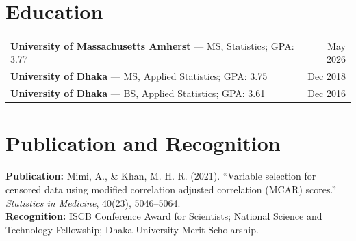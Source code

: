 \documentclass[10pt,letterpaper]{article}
\begin{document}
\section{Education}
\begin{tabularx}{\textwidth}{@{}Xr@{}}
\textbf{University of Massachusetts Amherst} --- MS, Statistics; GPA: 3.77 & May 2026\\
\textbf{University of Dhaka} --- MS, Applied Statistics; GPA: 3.75 & Dec 2018\\
\textbf{University of Dhaka} --- BS, Applied Statistics; GPA: 3.61 & Dec 2016
\end{tabularx}

\section{Publication and Recognition}
\textbf{Publication:} Mimi, A., \& Khan, M. H. R. (2021). ``Variable selection for censored data using modified correlation adjusted correlation (MCAR) scores.'' \textit{Statistics in Medicine}, 40(23), 5046--5064.\\
\textbf{Recognition:} ISCB Conference Award for Scientists; National Science and Technology Fellowship; Dhaka University Merit Scholarship.
\end{document}
